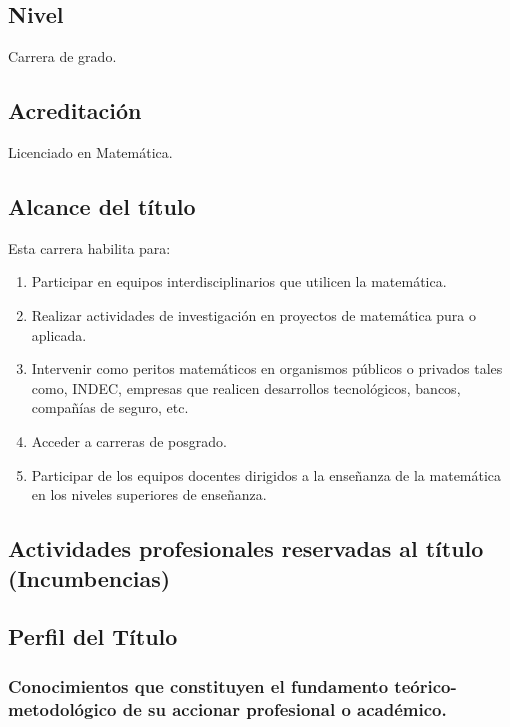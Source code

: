 \documentclass[a4paper, 12pt]{article}
\begin{document}
\subsection{Nivel} Carrera de grado.

\subsection{Acreditación} Licenciado en Matemática.

\subsection{Alcance del título} Esta carrera habilita para:
    \begin{enumerate}

        \item Participar en equipos interdisciplinarios que utilicen la matemática.
        
        \item  Realizar actividades de investigación en proyectos de matemática         pura o aplicada.
       
       \item Intervenir  como peritos matemáticos en  organismos públicos o privados  tales como, INDEC,  empresas que realicen desarrollos tecnológicos, bancos,   compañías de seguro, etc.
       
        \item Acceder a carreras de posgrado.
       
       \item Participar de los equipos docentes dirigidos a la
         enseñanza de la matemática en los niveles superiores de enseñanza.
    
       
         
    \end{enumerate}

\subsection{Actividades profesionales reservadas al título (Incumbencias)}
    
\subsection{Perfil del Título}
 


\subsubsection{Conocimientos que constituyen el fundamento teórico-metodológico de su accionar profesional o académico.}
\end{document}
